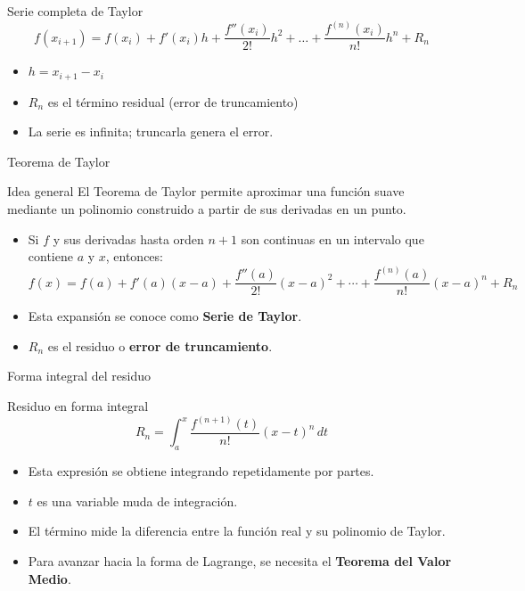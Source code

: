 \documentclass[main.tex]{subfiles}
\begin{document}
\begin{frame}{Serie completa de Taylor}
\begin{equation*}
\boxed{  f(x_{i+1}) = f(x_i) + f'(x_i)h + \frac{f''(x_i)}{2!}h^2 + \dots + \frac{f^{(n)}(x_i)}{n!}h^n + R_n}
\end{equation*}
\begin{itemize}
  \item \( h = x_{i+1} - x_i \)
  \item \( R_n \) es el término residual (error de truncamiento)
  \item La serie es infinita; truncarla genera el error.
\end{itemize}
\end{frame}

\begin{frame}{Teorema de Taylor}
\small
\begin{block}{Idea general}
\vspace{0.2cm}
El Teorema de Taylor permite aproximar una función suave mediante
un polinomio construido a partir de sus derivadas en un punto.
\end{block}

\begin{itemize}
  \item Si \(f\) y sus derivadas hasta orden \(n+1\) son continuas en un intervalo que contiene \(a\) y \(x\),
  entonces:
\[
f(x) = f(a) 
+ f'(a)(x-a)
+ \frac{f''(a)}{2!}(x-a)^2
+ \cdots
+ \frac{f^{(n)}(a)}{n!}(x-a)^n
+ R_n
\]
  \item Esta expansión se conoce como \textbf{Serie de Taylor}.
  \item \(R_n\) es el residuo o \textbf{error de truncamiento}.
\end{itemize}
\end{frame}

\begin{frame}{Forma integral del residuo}
\small
\begin{block}{Residuo en forma integral}
\[
R_n = \int_{a}^{x} 
\frac{f^{(n+1)}(t)}{n!}
(x-t)^n\, dt
\]
\end{block}

\begin{itemize}
  \item Esta expresión se obtiene integrando repetidamente por partes.
  \item \(t\) es una variable muda de integración.
  \item El término mide la diferencia entre la función real y su polinomio de Taylor.
  \item Para avanzar hacia la forma de Lagrange, se necesita el \textbf{Teorema del Valor Medio}.
\end{itemize}
\end{frame}
\end{document}
